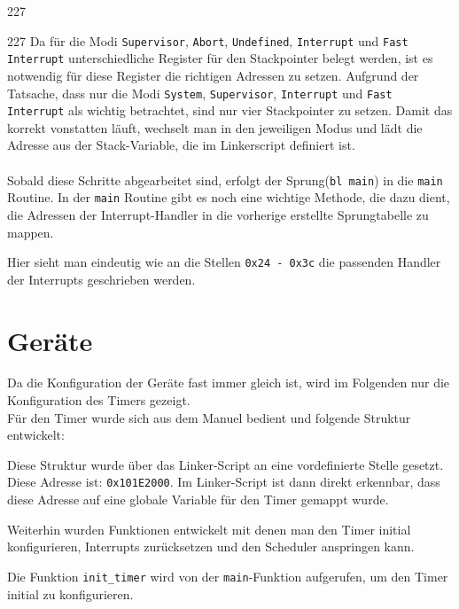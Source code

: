 \begin{dinglist}{227}
\begin{dinglist}{227}
Da f\"ur die Modi \texttt{Supervisor}, \texttt{Abort}, \texttt{Undefined}, \texttt{Interrupt} und \texttt{Fast Interrupt} unterschiedliche Register f\"ur den Stackpointer belegt werden, ist es notwendig f\"ur diese Register die richtigen Adressen zu setzen. Aufgrund der Tatsache, dass \mops nur die Modi \texttt{System}, \texttt{Supervisor}, \texttt{Interrupt} und \texttt{Fast Interrupt} als wichtig betrachtet, sind nur vier Stackpointer zu setzen. Damit das korrekt vonstatten l\"auft, wechselt man in den jeweiligen Modus und l\"adt die Adresse aus der  Stack-Variable, die im Linkerscript definiert ist.\\\\
Sobald diese Schritte abgearbeitet sind, erfolgt der Sprung(\texttt{bl main}) in die \texttt{main} Routine.
In der \texttt{main} Routine gibt es noch eine wichtige Methode, die dazu dient, die Adressen der Interrupt-Handler in die vorherige erstellte Sprungtabelle zu mappen.
 
Hier sieht man eindeutig wie an die Stellen \texttt{0x24 - 0x3c} die passenden Handler der Interrupts geschrieben werden. 
\end{dinglist}
\end{dinglist} 
\section{Ger\"ate}
Da die Konfiguration der Ger\"ate fast immer gleich ist, wird im Folgenden nur die Konfiguration des Timers gezeigt. \\
F\"ur den Timer wurde sich aus dem Manuel\parencite[vgl. Tabelle 3-1][34]{timerRef} bedient und folgende Struktur entwickelt:
 
Diese Struktur wurde \"uber das Linker-Script an eine vordefinierte Stelle gesetzt. Diese Adresse ist: \texttt{0x101E2000}\parencite[vgl. Tabelle 4-72][262]{archManI}. Im Linker-Script ist dann direkt erkennbar, dass diese Adresse auf eine globale Variable f\"ur den Timer gemappt wurde.

Weiterhin wurden Funktionen entwickelt mit denen man den Timer initial  konfigurieren, Interrupts zur\"ucksetzen und den Scheduler anspringen kann.

Die Funktion \texttt{init\_timer} wird von der \texttt{main}-Funktion aufgerufen, um den Timer initial zu konfigurieren.
